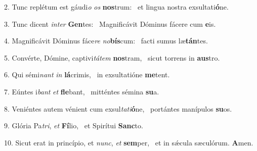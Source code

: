 2. Tunc replétum est gáudi\textit{o} \textit{os} \textbf{nos}trum: \ast\  et lingua nostra exsultati\textbf{ó}ne.\

3. Tunc dicent \textit{in}\textit{ter} \textbf{Gen}tes: \ast\  Magnificávit Dóminus fácere cum \textbf{e}is.\

4. Magnificávit Dóminus fáce\textit{re} \textit{no}\textbf{bís}cum: \ast\  facti sumus læ\textbf{tán}tes.\

5. Convérte, Dómine, captivi\textit{tá}\textit{tem} \textbf{nos}tram, \ast\  sicut torrens in \textbf{aus}tro.\

6. Qui sémi\textit{nant} \textit{in} \textbf{lá}crimis, \ast\  in exsultatióne \textbf{me}tent.\

7. Eúntes i\textit{bant} \textit{et} \textbf{fle}bant, \ast\  mitténtes sémina \textbf{su}a.\

8. Veniéntes autem vénient cum exsul\textit{ta}\textit{ti}\textbf{ó}ne, \ast\  portántes manípulos \textbf{su}os.\

9. Glória Pa\textit{tri}, \textit{et} \textbf{Fí}lio, \ast\  et Spirítui \textbf{Sanc}to.\

10. Sicut erat in princípio, et \textit{nunc}, \textit{et} \textbf{sem}per, \ast\  et in sǽcula sæculórum. \textbf{A}men.\

